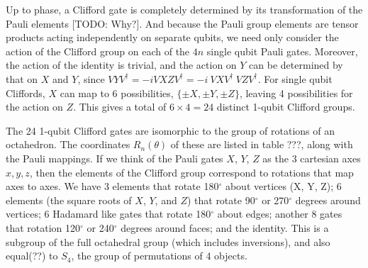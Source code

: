Up to phase, a Clifford gate is completely determined by its transformation of the Pauli elements [TODO: Why?]. And because the Pauli group elements are tensor products acting independently on separate qubits, we need only consider the action of the Clifford group on each of the $4n$ single qubit Pauli gates. Moreover, the action of the identity is trivial, and the action on $Y$ can be determined by that on $X$ and $Y$, since $VYV^\dagger= -i VXZV^\dagger = -i\ VXV^\dagger\ VZV^\dagger$. For single qubit Cliffords, $X$ can map to 6 possibilities, $\{\pm X, \pm Y, \pm Z\}$,  leaving 4 possibilities for the action on $Z$. This gives a total of $6\times4=24$ distinct 1-qubit Clifford groups. 

The 24 1-qubit Clifford gates are isomorphic to the group of rotations of an octahedron.  The coordinates $R_n(\theta)$ of these are listed in table ???, along with the Pauli mappings.
 If we think of the Pauli gates $X$, $Y$, $Z$ as the 3 cartesian axes $x, y, z$, then the elements of the Clifford group correspond to rotations that map axes to axes. We have 3 elements that rotate 180$^{\circ}$ about vertices (X, Y, Z); 6 elements (the square roots of $X$, $Y$, and $Z$) that rotate 90$^{\circ}$ or 270$^{\circ}$ degrees around vertices; 6 Hadamard like gates that rotate 180$^{\circ}$ about edges; another 8 gates that rotation 120$^{\circ}$ or 240$^{\circ}$ degrees around faces; and the identity. This is a subgroup of the full octahedral group (which includes inversions), and also equal(??) to $S_4$, the group of permutations of 4 objects.
  

\begin{center}
 \end{center}


